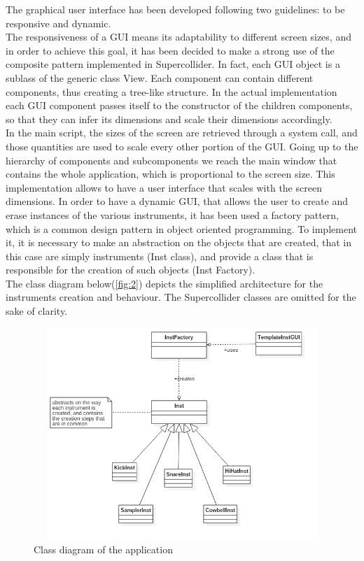 \documentclass[main.tex]{subfiles}
\begin{document}
The graphical user interface has been developed following two guidelines: to be responsive and dynamic.\\
The responsiveness of a GUI means its adaptability to different screen sizes, and in order to achieve this goal, it has been decided to make a strong use of the composite pattern implemented in Supercollider. In fact, each GUI object is a sublass of the generic class View. Each component can contain different components, thus creating a tree-like structure. In the actual implementation each GUI component passes itself to the constructor of the children components, so that they can infer its dimensions and scale their dimensions accordingly.\\
 In the main script, the sizes of the screen are retrieved through a system call, and those quantities are used to scale every other portion of the GUI. Going up to the hierarchy of components and subcomponents we reach the main window that contains the whole application, which is proportional to the screen size. This implementation allows to have a user interface that scales with the screen dimensions.
In order to have a dynamic GUI, that allows the user to create and erase instances of the various instruments, it has been used a factory pattern, which is a common design pattern in object oriented programming. To implement it, it is necessary to make an abstraction on the objects that are created, that in this case are simply instruments (Inst class), and provide a class that is responsible for the creation of such objects (Inst Factory).\\
The class diagram below(\autoref{fig:2}) depicts the simplified architecture for the instruments creation and behaviour. The Supercollider classes are omitted for the sake of clarity.
\begin{figure}[htbp]
\centering
\includegraphics[height=8cm, width=12cm]{images/factory_pattern_uml.png}
\caption{Class diagram of the application}
\label{fig:2}
\end{figure}
\end{document}
